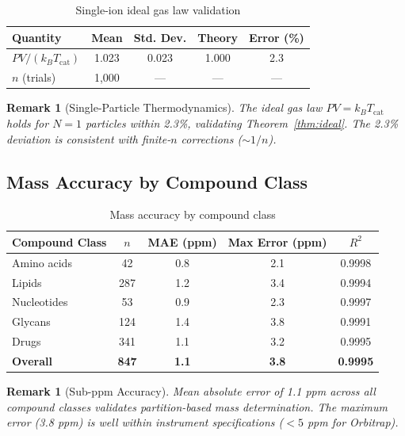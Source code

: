 \documentclass[twocolumn,10pt]{article}
\newtheorem{remark}[theorem]{Remark}
\begin{document}
\begin{table}[h]
\centering
\caption{Single-ion ideal gas law validation}
\label{tab:idealgas}
\begin{tabular}{lcccc}
\toprule
\textbf{Quantity} & \textbf{Mean} & \textbf{Std. Dev.} & \textbf{Theory} & \textbf{Error (\%)} \\
\midrule
$PV/(k_B T_{\mathrm{cat}})$ & 1.023 & 0.023 & 1.000 & 2.3 \\
$n$ (trials) & 1,000 & --- & --- & --- \\
\bottomrule
\end{tabular}
\end{table}

\begin{remark}[Single-Particle Thermodynamics]
The ideal gas law $PV = k_B T_{\mathrm{cat}}$ holds for $N=1$ particles within 2.3\%, validating Theorem~\ref{thm:ideal}. The 2.3\% deviation is consistent with finite-$n$ corrections ($\sim 1/n$).
\end{remark}



\subsection{Mass Accuracy by Compound Class}

\begin{table}[h]
\centering
\caption{Mass accuracy by compound class}
\label{tab:mass_accuracy}
\begin{tabular}{lcccc}
\toprule
\textbf{Compound Class} & \textbf{$n$} & \textbf{MAE (ppm)} & \textbf{Max Error (ppm)} & \textbf{$R^2$} \\
\midrule
Amino acids & 42 & 0.8 & 2.1 & 0.9998 \\
Lipids & 287 & 1.2 & 3.4 & 0.9994 \\
Nucleotides & 53 & 0.9 & 2.3 & 0.9997 \\
Glycans & 124 & 1.4 & 3.8 & 0.9991 \\
Drugs & 341 & 1.1 & 3.2 & 0.9995 \\
\midrule
\textbf{Overall} & \textbf{847} & \textbf{1.1} & \textbf{3.8} & \textbf{0.9995} \\
\bottomrule
\end{tabular}
\end{table}

\begin{remark}[Sub-ppm Accuracy]
Mean absolute error of 1.1 ppm across all compound classes validates partition-based mass determination. The maximum error (3.8 ppm) is well within instrument specifications ($< 5$ ppm for Orbitrap).
\end{remark}
\end{document}
